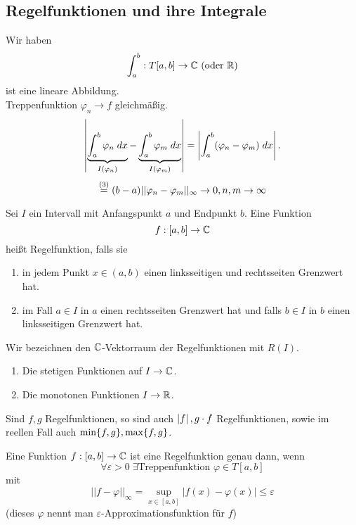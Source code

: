\documentclass[../ana2.tex]{subfiles}
\begin{document}
\subsection{Regelfunktionen und ihre Integrale}
Wir haben 
\[ \abb{\int_a^b}{T[a,b]}{\C} \text{ (oder } \R \text{)} \]
ist eine lineare Abbildung.\\
Treppenfunktion \( \varphi_n \rightarrow f \) gleichmäßig.
\[ \abs{ \underbrace{\integral{\varphi_n} {a}{b}}_{I(\varphi_n)} 
- \underbrace{\integral{\varphi_m} {a}{b}}_{I(\varphi_m)} } 
= \abs{ \integral{(\varphi_n - \varphi_m)}{a}{b} }. \]
\[ \oversett{(3)}{=} (b-a) ||\varphi_n-\varphi_m||_\infty 
\rightarrow 0, n,m \rightarrow \infty \]
\begin{defi}[Regelfunktion]
    Sei \( I \) ein Intervall mit Anfangspunkt \(a\) 
    und Endpunkt \(b\). Eine Funktion 
    \[ \abb{f}{[a,b]}{\C} \] 
    heißt Regelfunktion, falls sie 
    \begin{enumerate}
        \item in jedem Punkt \(x \in (a,b)\) 
        einen linksseitigen und rechtsseiten 
        Grenzwert hat.
        
        \item im Fall \( a \in I \) in \(a\) einen 
        rechtsseiten Grenzwert hat und falls 
        \( b \in I \) in \(b\) 
        einen linksseitigen Grenzwert hat.
    \end{enumerate}
    Wir bezeichnen den \( \C \)-Vektorraum der 
    Regelfunktionen mit \( R(I) \).
    \begin{bspe}
        \begin{enumerate}
            \item Die stetigen Funktionen auf \( I \rightarrow \C \).
            \item Die monotonen Funktionen \( I \rightarrow \R \).
        \end{enumerate}      
    \end{bspe}
    Sind \( f,g \) Regelfunktionen, so sind auch 
    \( \abs{f}, g\cdot f \) Regelfunktionen, sowie im 
    reellen Fall auch \( \min\set{f,g}, \max\set{f,g} \).
\end{defi}
\begin{satz}[Approximationssatz]
    Eine Funktion \( \abb{f}{[a,b]}{\C} \) ist 
    eine Regelfunktion genau dann, wenn 
    \[ \forall \varepsilon > 0 \; \exists 
    \text{Treppenfunktion } \varphi \in T[a,b] \]
    mit 
    \[ ||f - \varphi||_\infty 
    = \underset{x \in [a,b]}{\sup} |f(x) - \varphi(x)| 
    \leq \varepsilon \]
    (dieses \(\varphi\) nennt man \( \varepsilon \)-Approximationsfunktion
    für \(f\))
\end{satz}
\end{document}
